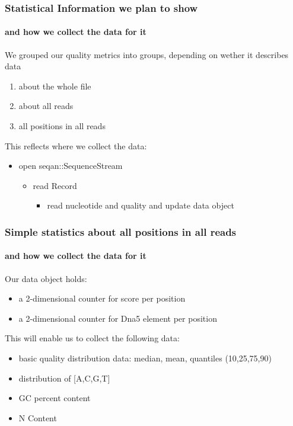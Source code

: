 \documentclass{beamer}
\begin{document}
\begin{frame}
 \frametitle{ Statistical Information we plan to show}
 \framesubtitle{and how we collect the data for it}

 We grouped our quality metrics into groups, depending on 
 wether it describes data 

 \begin{enumerate}
  \item about the whole file
  \item about all reads
  \item all positions in all reads 
 \end{enumerate}

This reflects where we collect the data:
\begin{itemize}
\item open seqan::SequenceStream
  \begin{itemize}
  \item read Record
    \begin{itemize}
    \item read nucleotide and quality and update data object
    \end{itemize}
  \end{itemize}
\end{itemize}
 
\end{frame}



\begin{frame}
 \frametitle{ Simple statistics about all positions in all reads }
 \framesubtitle{and how we collect the data for it}

Our data object holds:

 \begin{itemize}
  \item a 2-dimensional counter for score per position 
  \item a 2-dimensional counter for Dna5 element per position 
 \end{itemize}

This will enable us to collect the following data:

\begin{itemize}
 \item basic quality distribution data: median, mean, quantiles (10,25,75,90)
 \item distribution of [A,C,G,T]
 \item GC percent content
 \item N Content
\end{itemize}

\end{frame}
\end{document}
